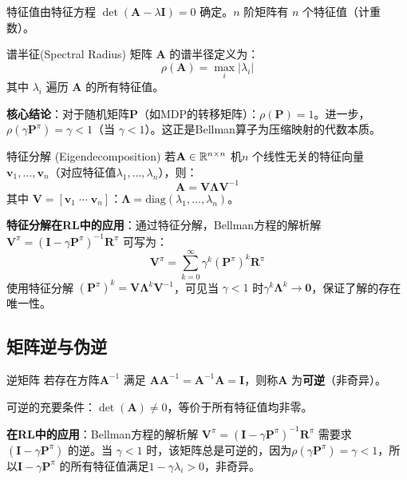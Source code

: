 特征值由特征方程 $\det(\mathbf{A} - \lambda \mathbf{I}) = 0$ 确定。$n$ 阶矩阵有 $n$ 个特征值（计重数）。

\begin{myTheorem}{谱半征(Spectral Radius)}
矩阵 $\mathbf{A}$ 的谱半径定义为：
\[
\rho(\mathbf{A}) = \max_{i} |\lambda_i|
\]
其中 $\lambda_i$ 遍历 $\mathbf{A}$ 的所有特征值。

\textbf{核心结论}：对于随机矩阵$\mathbf{P}$（如MDP的转移矩阵）：$\rho(\mathbf{P}) = 1$。进一步，$\rho(\gamma \mathbf{P}^{\pi}) = \gamma < 1$（当 $\gamma < 1$）。这正是Bellman算子为压缩映射的代数本质。
\end{myTheorem}

\begin{myTheorem}{特征分解 (Eigendecomposition)}
若$\mathbf{A} \in \mathbb{R}^{n \times n}$ 机$n$ 个线性无关的特征向量 $\mathbf{v}_1, \dots, \mathbf{v}_n$（对应特征值$\lambda_1, \dots, \lambda_n$），则：
\[
\mathbf{A} = \mathbf{V} \boldsymbol{\Lambda} \mathbf{V}^{-1}
\]
其中 $\mathbf{V} = [\mathbf{v}_1 \; \cdots \; \mathbf{v}_n]$：$\boldsymbol{\Lambda} = \mathrm{diag}(\lambda_1, \dots, \lambda_n)$。
\end{myTheorem}

\textbf{特征分解在RL中的应用}：通过特征分解，Bellman方程的解析解 $\mathbf{V}^{\pi} = (\mathbf{I} - \gamma \mathbf{P}^{\pi})^{-1} \mathbf{R}^{\pi}$ 可写为：
\[
\mathbf{V}^{\pi} = \sum_{k=0}^{\infty} \gamma^k (\mathbf{P}^{\pi})^k \mathbf{R}^{\pi}
\]
使用特征分解 $(\mathbf{P}^{\pi})^k = \mathbf{V} \boldsymbol{\Lambda}^k \mathbf{V}^{-1}$，可见当 $\gamma < 1$ 时$\gamma^k \boldsymbol{\Lambda}^k \to \mathbf{0}$，保证了解的存在唯一性。

\subsection{矩阵逆与伪逆}

\begin{mydefinition}{逆矩阵}
若存在方阵$\mathbf{A}^{-1}$ 满足 $\mathbf{A} \mathbf{A}^{-1} = \mathbf{A}^{-1} \mathbf{A} = \mathbf{I}$，则称$\mathbf{A}$ 为\textbf{可逆}（非奇异）。
\end{mydefinition}

可逆的充要条件：$\det(\mathbf{A}) \neq 0$，等价于所有特征值均非零。

\textbf{在RL中的应用}：Bellman方程的解析解 $\mathbf{V}^{\pi} = (\mathbf{I} - \gamma \mathbf{P}^{\pi})^{-1} \mathbf{R}^{\pi}$ 需要求 $(\mathbf{I} - \gamma \mathbf{P}^{\pi})$ 的逆。当 $\gamma < 1$ 时，该矩阵总是可逆的，因为$\rho(\gamma \mathbf{P}^{\pi}) = \gamma < 1$，所以$\mathbf{I} - \gamma \mathbf{P}^{\pi}$ 的所有特征值满足$1 - \gamma \lambda_i > 0$，非奇异。

